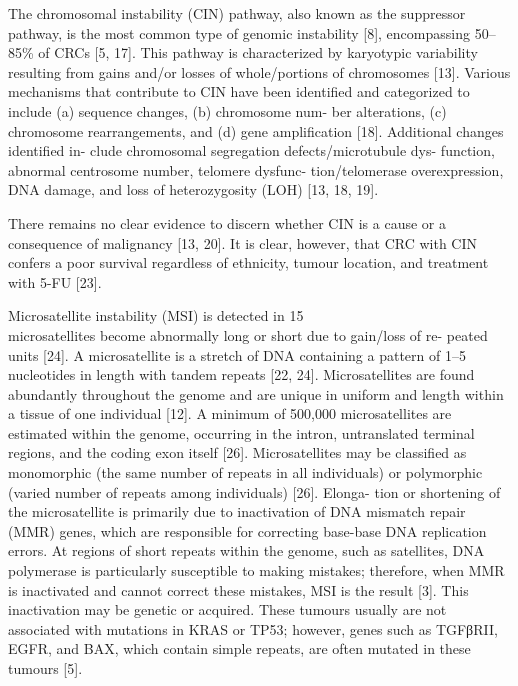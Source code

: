   The chromosomal instability (CIN) pathway, also known as the suppressor
  pathway, is the most common type of genomic instability [8], encompassing
  50–85\% of CRCs [5, 17]. This pathway is characterized by karyotypic
  variability resulting from gains and/or losses of whole/portions of
  chromosomes [13]. Various mechanisms that contribute to CIN have been
  identified and categorized to include (a) sequence changes, (b) chromosome
  num- ber alterations, (c) chromosome rearrangements, and (d) gene
  amplification [18]. Additional changes identified in- clude chromosomal
  segregation defects/microtubule dys- function, abnormal centrosome number,
  telomere dysfunc- tion/telomerase overexpression, DNA damage, and loss of
  heterozygosity (LOH) [13, 18, 19].

  There remains no clear evidence to discern whether CIN is a cause or a
  consequence of malignancy [13, 20]. It is clear, however, that CRC with CIN
  confers a poor survival regardless of ethnicity, tumour location, and
  treatment with 5-FU [23].

  Microsatellite instability (MSI) is detected in 15\\%
  microsatellites become abnormally long or short due to gain/loss of re- peated
  units [24]. A microsatellite is a stretch of DNA containing a pattern of 1–5
  nucleotides in length with tandem repeats [22, 24]. Microsatellites are found
  abundantly throughout the genome and are unique in uniform and length within a
  tissue of one individual [12]. A minimum of 500,000 microsatellites are
  estimated within the genome, occurring in the intron, untranslated terminal
  regions, and the coding exon itself [26]. Microsatellites may be classified as
  monomorphic (the same number of repeats in all individuals) or polymorphic
  (varied number of repeats among individuals) [26]. Elonga- tion or shortening
  of the microsatellite is primarily due to inactivation of DNA mismatch repair
  (MMR) genes, which are responsible for correcting base-base DNA replication
  errors. At regions of short repeats within the genome, such as satellites, DNA
  polymerase is particularly susceptible to making mistakes; therefore, when MMR
  is inactivated and cannot correct these mistakes, MSI is the result [3]. This
  inactivation may be genetic or acquired. These tumours usually are not
  associated with mutations in KRAS or TP53; however, genes such as TGFβRII,
  EGFR, and BAX, which contain simple repeats, are often mutated in these
  tumours [5].

